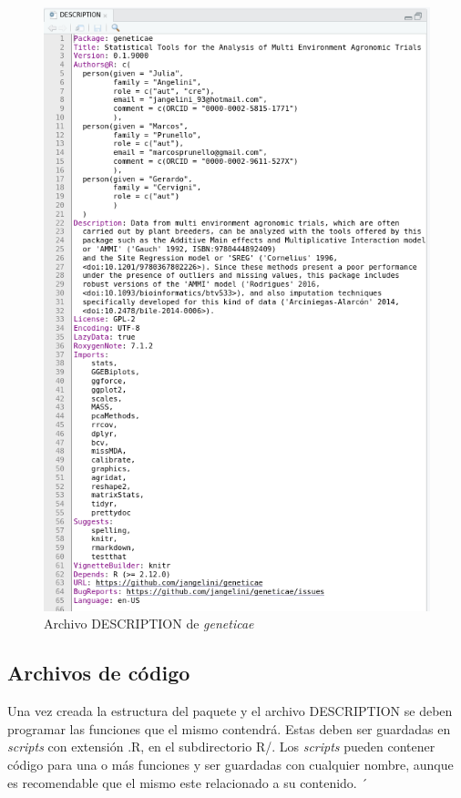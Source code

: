  \begin{figure}[H]
	\begin{center}
		\includegraphics[width=13cm]{./Graficos/DESCRIPTION.png}	
	\end{center}
	\caption{Archivo DESCRIPTION de \emph{geneticae}}
	\label{fig:fig33}
\end{figure}



\subsection{Archivos de código}

Una vez creada la estructura del paquete y el archivo DESCRIPTION se deben programar las funciones que el mismo contendrá. Estas deben ser guardadas en \emph{scripts} con extensión .R, en el subdirectorio R/. Los \emph{scripts} pueden contener código para una o más funciones y ser guardadas con cualquier nombre, aunque es recomendable que el mismo este relacionado a su contenido. ´ 

